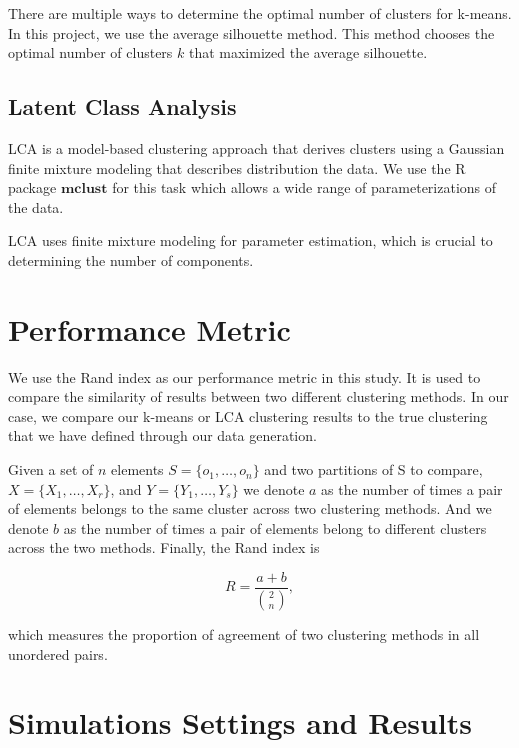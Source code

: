 \documentclass[
]{article}
\begin{document}
There are multiple ways to determine the optimal number of clusters for
k-means. In this project, we use the average silhouette method. This
method chooses the optimal number of clusters \(k\) that maximized the
average silhouette.

\hypertarget{latent-class-analysis}{%
\subsection{Latent Class Analysis}\label{latent-class-analysis}}

LCA is a model-based clustering approach that derives clusters using a
Gaussian finite mixture modeling that describes distribution the data.
We use the R package \(\textbf{mclust}\) for this task which allows a
wide range of parameterizations of the data.

LCA uses finite mixture modeling for parameter estimation, which is
crucial to determining the number of components.

\hypertarget{performance-metric}{%
\section{Performance Metric}\label{performance-metric}}

We use the Rand index as our performance metric in this study. It is
used to compare the similarity of results between two different
clustering methods. In our case, we compare our k-means or LCA
clustering results to the true clustering that we have defined through
our data generation.

Given a set of \(n\) elements \(S = \{o_1, \dots, o_n\}\) and two
partitions of S to compare, \(X = \{X_1, \dots, X_r\}\), and
\(Y = \{Y_1, \dots, Y_s\}\) we denote \(a\) as the number of times a
pair of elements belongs to the same cluster across two clustering
methods. And we denote \(b\) as the number of times a pair of elements
belong to different clusters across the two methods. Finally, the Rand
index is

\begin{equation*}
R = \frac{a+b}{{2 \choose n}},
\end{equation*}

which measures the proportion of agreement of two clustering methods in
all unordered pairs.

\hypertarget{simulations-settings-and-results}{%
\section{Simulations Settings and
Results}\label{simulations-settings-and-results}}
\end{document}

